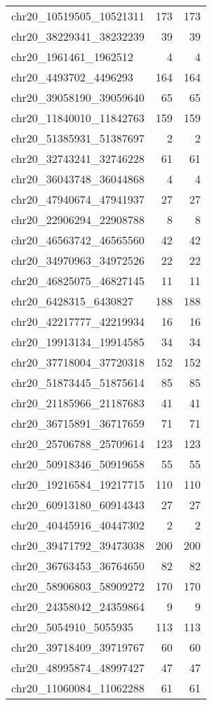 \begin{longtable}{lrr}
chr20_10519505_10521311 & 173 & 173 \\
chr20_38229341_38232239 & 39 & 39 \\
chr20_1961461_1962512 & 4 & 4 \\
chr20_4493702_4496293 & 164 & 164 \\
chr20_39058190_39059640 & 65 & 65 \\
chr20_11840010_11842763 & 159 & 159 \\
chr20_51385931_51387697 & 2 & 2 \\
chr20_32743241_32746228 & 61 & 61 \\
chr20_36043748_36044868 & 4 & 4 \\
chr20_47940674_47941937 & 27 & 27 \\
chr20_22906294_22908788 & 8 & 8 \\
chr20_46563742_46565560 & 42 & 42 \\
chr20_34970963_34972526 & 22 & 22 \\
chr20_46825075_46827145 & 11 & 11 \\
chr20_6428315_6430827 & 188 & 188 \\
chr20_42217777_42219934 & 16 & 16 \\
chr20_19913134_19914585 & 34 & 34 \\
chr20_37718004_37720318 & 152 & 152 \\
chr20_51873445_51875614 & 85 & 85 \\
chr20_21185966_21187683 & 41 & 41 \\
chr20_36715891_36717659 & 71 & 71 \\
chr20_25706788_25709614 & 123 & 123 \\
chr20_50918346_50919658 & 55 & 55 \\
chr20_19216584_19217715 & 110 & 110 \\
chr20_60913180_60914343 & 27 & 27 \\
chr20_40445916_40447302 & 2 & 2 \\
chr20_39471792_39473038 & 200 & 200 \\
chr20_36763453_36764650 & 82 & 82 \\
chr20_58906803_58909272 & 170 & 170 \\
chr20_24358042_24359864 & 9 & 9 \\
chr20_5054910_5055935 & 113 & 113 \\
chr20_39718409_39719767 & 60 & 60 \\
chr20_48995874_48997427 & 47 & 47 \\
chr20_11060084_11062288 & 61 & 61 \\

\end{longtable}
